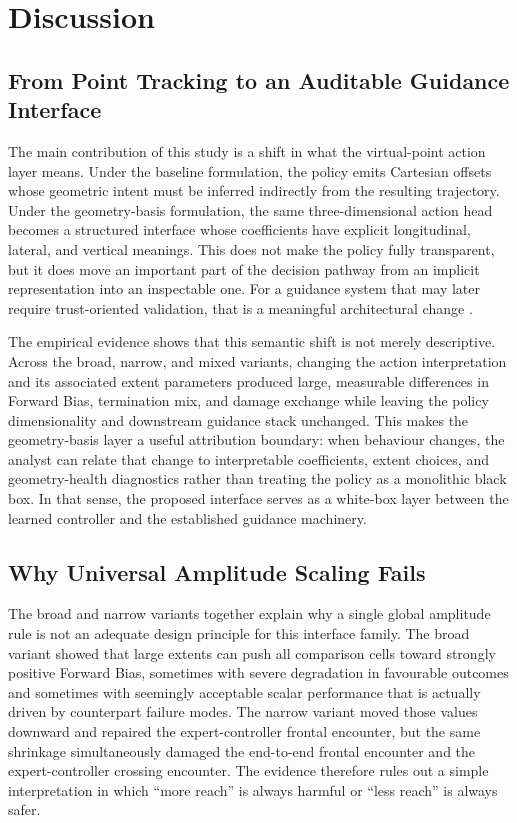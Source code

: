 \documentclass[drones,article,submit,pdftex,moreauthors]{Definitions/mdpi}
\begin{document}
\section{Discussion}

\subsection{From Point Tracking to an Auditable Guidance Interface}

The main contribution of this study is a shift in what the virtual-point action layer means. Under the baseline formulation, the policy emits Cartesian offsets whose geometric intent must be inferred indirectly from the resulting trajectory. Under the geometry-basis formulation, the same three-dimensional action head becomes a structured interface whose coefficients have explicit longitudinal, lateral, and vertical meanings. This does not make the policy fully transparent, but it does move an important part of the decision pathway from an implicit representation into an inspectable one. For a guidance system that may later require trust-oriented validation, that is a meaningful architectural change \cite{glanois2024,paterson2025}.

The empirical evidence shows that this semantic shift is not merely descriptive. Across the broad, narrow, and mixed variants, changing the action interpretation and its associated extent parameters produced large, measurable differences in Forward Bias, termination mix, and damage exchange while leaving the policy dimensionality and downstream guidance stack unchanged. This makes the geometry-basis layer a useful attribution boundary: when behaviour changes, the analyst can relate that change to interpretable coefficients, extent choices, and geometry-health diagnostics rather than treating the policy as a monolithic black box. In that sense, the proposed interface serves as a white-box layer between the learned controller and the established guidance machinery.

\subsection{Why Universal Amplitude Scaling Fails}

The broad and narrow variants together explain why a single global amplitude rule is not an adequate design principle for this interface family. The broad variant showed that large extents can push all comparison cells toward strongly positive Forward Bias, sometimes with severe degradation in favourable outcomes and sometimes with seemingly acceptable scalar performance that is actually driven by counterpart failure modes. The narrow variant moved those values downward and repaired the expert-controller frontal encounter, but the same shrinkage simultaneously damaged the end-to-end frontal encounter and the expert-controller crossing encounter. The evidence therefore rules out a simple interpretation in which ``more reach'' is always harmful or ``less reach'' is always safer.
\end{document}
